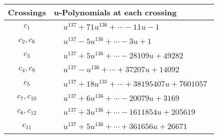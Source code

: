 \documentclass[1p]{elsarticle_modified}
\theoremstyle{definition}
\begin{document}
\begin{tabular}{m{50pt}|m{274pt}}
Crossings & \hspace{64pt}u-Polynomials at each crossing \\
\hline $$\begin{aligned}c_{1}\end{aligned}$$&$\begin{aligned}
&u^{137}+71 u^{136}+\cdots-11 u-1
\end{aligned}$\\
\hline $$\begin{aligned}c_{2},c_{6}\end{aligned}$$&$\begin{aligned}
&u^{137}-5 u^{136}+\cdots-3 u+1
\end{aligned}$\\
\hline $$\begin{aligned}c_{3}\end{aligned}$$&$\begin{aligned}
&u^{137}+5 u^{136}+\cdots-28109 u+49282
\end{aligned}$\\
\hline $$\begin{aligned}c_{4},c_{9}\end{aligned}$$&$\begin{aligned}
&u^{137}- u^{136}+\cdots+37207 u+14092
\end{aligned}$\\
\hline $$\begin{aligned}c_{5}\end{aligned}$$&$\begin{aligned}
&u^{137}+18 u^{135}+\cdots+38195407 u+7601057
\end{aligned}$\\
\hline $$\begin{aligned}c_{7},c_{10}\end{aligned}$$&$\begin{aligned}
&u^{137}+6 u^{136}+\cdots-20079 u+3169
\end{aligned}$\\
\hline $$\begin{aligned}c_{8},c_{12}\end{aligned}$$&$\begin{aligned}
&u^{137}+3 u^{136}+\cdots-1611854 u+205619
\end{aligned}$\\
\hline $$\begin{aligned}c_{11}\end{aligned}$$&$\begin{aligned}
&u^{137}+5 u^{136}+\cdots+361656 u+26671
\end{aligned}$\\
\hline
\end{tabular}\\~\\
\end{document}
